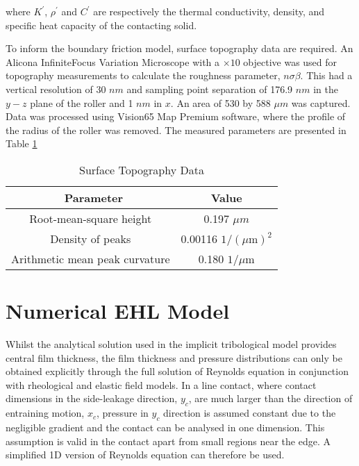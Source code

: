 where $K^{\prime}$, $\rho^{\prime}$ and $C^{\prime}$ are respectively the thermal conductivity, density, and specific heat capacity of the contacting solid. 

To inform the boundary friction model, surface topography data are required. An Alicona InfiniteFocus Variation Microscope with a $\times 10$ objective was used for topography measurements to calculate the roughness parameter, $n\sigma\beta$. This had a vertical resolution of 30 $nm$ and sampling point separation of 176.9 $nm$ in the $y-z$ plane of the roller and 1 $nm$ in $x$. An area of 530 by 588 $\mu m$ was captured. Data was processed using Vision65 Map Premium software, where the profile of the radius of the roller was removed. The measured parameters are presented in Table \ref{Surface Topography Data}

\begin{table*}
	\caption{Surface Topography Data}
	\label{Surface Topography Data}
	\centering
	\renewcommand{\arraystretch}{1.5}%
	\begin{tabular}{|c|c|}
		\hline
		\ \textbf{Parameter} & \textbf{Value} \\ [0.5ex]
		\hline
		Root-mean-square height & 0.197 $\mu m$ \\ [0.5ex]
		\hline
		Density of peaks & 0.00116 $1 /(\mu \mathrm{m})^2$ \\ [0.5ex]
		\hline
		Arithmetic mean peak curvature & 0.180 $1 / \mu \mathrm{m}$ \\ [0.5ex]
		\hline
	\end{tabular}
\end{table*}

\section{Numerical EHL Model}\label{1D EHL Model}

Whilst the analytical solution used in the implicit tribological model provides central film thickness, the film thickness and pressure distributions can only be obtained explicitly through the full solution of Reynolds equation in conjunction with rheological and elastic field models. In a line contact, where contact dimensions in the side-leakage direction, $y_c$, are much larger than the direction of entraining motion, $x_c$, pressure in $y_c$ direction is assumed constant due to the negligible gradient and the contact can be analysed in one dimension. This assumption is valid in the contact apart from small regions near the edge. A simplified 1D version of Reynolds equation can therefore be used.


